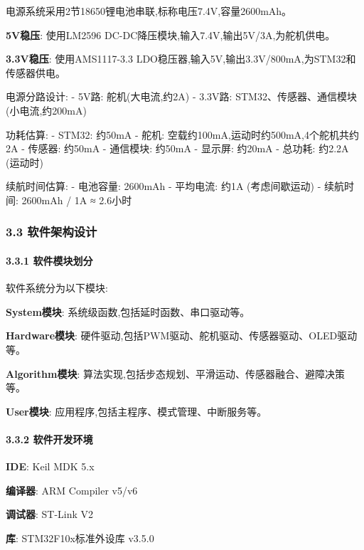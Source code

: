 \documentclass[
]{article}
\begin{document}
电源系统采用2节18650锂电池串联,标称电压7.4V,容量2600mAh。

\textbf{5V稳压}: 使用LM2596
DC-DC降压模块,输入7.4V,输出5V/3A,为舵机供电。

\textbf{3.3V稳压}: 使用AMS1117-3.3
LDO稳压器,输入5V,输出3.3V/800mA,为STM32和传感器供电。

电源分路设计: - 5V路: 舵机(大电流,约2A) - 3.3V路:
STM32、传感器、通信模块(小电流,约200mA)

功耗估算: - STM32: 约50mA - 舵机:
空载约100mA,运动时约500mA,4个舵机共约2A - 传感器: 约50mA - 通信模块:
约50mA - 显示屏: 约20mA - 总功耗: 约2.2A (运动时)

续航时间估算: - 电池容量: 2600mAh - 平均电流: 约1A (考虑间歇运动) -
续航时间: 2600mAh / 1A ≈ 2.6小时

\hypertarget{ux8f6fux4ef6ux67b6ux6784ux8bbeux8ba1}{%
\subsubsection{3.3
软件架构设计}\label{ux8f6fux4ef6ux67b6ux6784ux8bbeux8ba1}}

\hypertarget{ux8f6fux4ef6ux6a21ux5757ux5212ux5206}{%
\paragraph{3.3.1
软件模块划分}\label{ux8f6fux4ef6ux6a21ux5757ux5212ux5206}}

软件系统分为以下模块:

\textbf{System模块}: 系统级函数,包括延时函数、串口驱动等。

\textbf{Hardware模块}:
硬件驱动,包括PWM驱动、舵机驱动、传感器驱动、OLED驱动等。

\textbf{Algorithm模块}:
算法实现,包括步态规划、平滑运动、传感器融合、避障决策等。

\textbf{User模块}: 应用程序,包括主程序、模式管理、中断服务等。

\hypertarget{ux8f6fux4ef6ux5f00ux53d1ux73afux5883}{%
\paragraph{3.3.2
软件开发环境}\label{ux8f6fux4ef6ux5f00ux53d1ux73afux5883}}

\textbf{IDE}: Keil MDK 5.x

\textbf{编译器}: ARM Compiler v5/v6

\textbf{调试器}: ST-Link V2

\textbf{库}: STM32F10x标准外设库 v3.5.0
\end{document}
